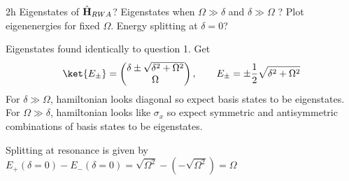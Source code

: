 \documentclass[12pt]{article}
\begin{document}
\begin{exc}{2h}
    Eigenstates of $\hat{\vb{H}}_{RWA}$? Eigenstates when $\Omega \gg \delta$ and $\delta \gg \Omega$ ? Plot eigenenergies for fixed $\Omega$. Energy splitting at $\delta = 0$?
\end{exc}
\begin{ans}
    Eigenstates found identically to question 1. Get 
    \[\ket{E_\pm} = \begin{pmatrix}
        \delta \pm \sqrt{\delta^2 + \Omega^2}\\
        \Omega
    \end{pmatrix}, \qquad E_{\pm} = \pm \frac12\sqrt{\delta^2 + \Omega^2}\]
    For $\delta \gg \Omega$, hamiltonian looks diagonal so expect basis states to be eigenstates. For $\Omega \gg \delta$, hamiltonian looks like $\sigma_x$ so expect symmetric and antisymmetric combinations of basis states to be eigenstates.

    Splitting at resonance is given by $E_+(\delta = 0) - E_-(\delta = 0) = \sqrt{\Omega^2} - (-\sqrt{\Omega^2}) = \Omega$
\end{ans}
\end{document}
